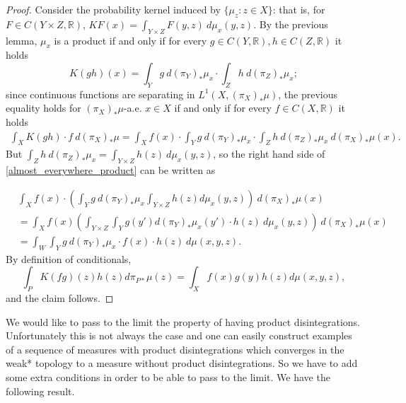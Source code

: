 \documentclass[11pt,letterpaper,reqno]{article}
\newcommand{\R}{\mathbb{R}}
\begin{document}
\begin{proof}
Consider the probability kernel induced by $\{\mu_z:z\in X\}$: that is, for $F\in C(Y \times Z, \R)$, 
\(
KF(x)=\int_{Y \times Z} F(y,z)\ d\mu_x(y,z)
\).
By the previous lemma, $\mu_x$ is a product if and only if for every $g \in C(Y,\mathbb R), h\in C(Z,\mathbb R)$ it holds
\[
	K(gh)(x)=\int_Y g \ d(\pi_{Y})_* \mu_x \cdot \int_Z h \ d(\pi_{Z})_*\mu_x; 
\]
since continuous functions are separating in $L^1(X,(\pi_{X})_*\mu)$, the previous equality holds for $(\pi_{X})_*\mu$-a.e. $x\in X$ if and only if for every $f\in C(X,\mathbb R)$ it holds
\begin{align} \label{almost_everywhere_product}
\int_X K(gh) \cdot f \ d(\pi_{X})_*\mu = \int_X f(x) \cdot \int_Y g \ d(\pi_{Y})_* \mu_x \cdot \int_Z h \ d(\pi_{Z})_*\mu_x \ d(\pi_X)_* \mu(x).
\end{align}
But $\int_Z h \ d(\pi_Z)_* \mu_x = \int_{Y \times Z} h(z) \ d\mu_x(y,z)$, so the right hand side of \eqref{almost_everywhere_product} can be written as

\begin{align*} &\int_X f(x) \cdot \left(\int_Y g \ d(\pi_{Y})_*\mu_x \int_{Y \times Z} h(z) d\mu_x(y, z)\right) \ d(\pi_{X})_*\mu(x)\\
& =\int_X  f(x) \left(\int_{Y \times Z} \int_Y g(y') d(\pi_{Y})_*\mu_x(y')\cdot h(z) \ d\mu_x(y, z)\right)  \ d(\pi_{X})_*\mu(x)\\
& =\int_W   \int_Y g \ d(\pi_{Y})_* \mu_x \cdot f(x) \cdot h(z)   \ d\mu(x,y,z).
\end{align*}
By definition of conditionals, 
\[\int_P K(fg)(z) h(z)d\pi_{P*}\mu(z)=\int_X f(x)g(y)h(z)d\mu(x,y,z),
\]
and the claim follows.
\end{proof}

We would like to pass to the limit the property of having product disintegrations. Unfortunately this is not always the case and one can easily construct examples of a sequence of measures with product disintegrations which converges in the weak* topology to a measure without product disintegrations. So we have to add some extra conditions in order to be able to pass to the limit. We have the following result.
\end{document}

